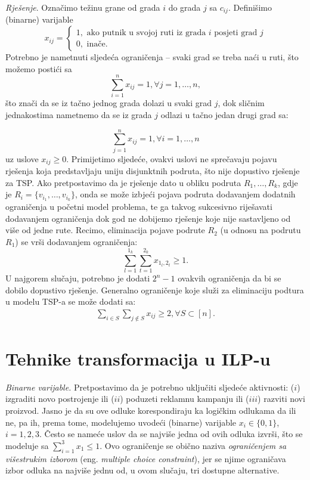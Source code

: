 \documentclass[a4paper, utf8, 11pt, colorlinks]{book}
\begin{document}
\emph{Rješenje}. Označimo težinu grane od grada $i$ do grada $j$ sa $c_{ij}$.  Definišimo (binarne) varijable 
$$x_{ij} = \begin{cases}
                1, \mbox{ ako putnik u svojoj ruti iz grada } i \mbox{ posjeti grad } j \\
                0, \mbox{ inače}. 
          \end{cases}$$ 
Potrebno je nametnuti sljedeća ograničenja -- svaki grad se treba naći u ruti,  što možemo postići sa 
$$  \sum_{i=1}^n x_{ij} = 1, \forall j =1,\ldots, n,$$ 
što znači da se iz tačno jednog grada dolazi u svaki grad $j$, dok sličnim jednakostima nametnemo da se iz grada $j$ odlazi u tačno jedan drugi grad sa:

$$  \sum_{j=1}^n x_{ij} = 1, \forall i =1,\ldots, n$$ 
 uz uslove $x_{ij}\geq 0$. Primijetimo sljedeće, ovakvi uslovi ne sprečavaju pojavu rješenja koja predstavljaju uniju disjunktnih podruta, što nije dopustivo rješenje za TSP. Ako pretpostavimo da je rješenje dato u obliku podruta $R_1, \ldots, R_k$, gdje je $R_i = \{ v_{i_1}, \ldots, v_{i_k} \}$, onda se može izbjeći pojava podruta dodavanjem dodatnih ograničenja u početni model problema, te ga takvog sukcesivno riješavati dodavanjem ograničenja dok god ne dobijemo rješenje koje nije sastavljeno od više od jedne rute. Recimo, eliminacija pojave podrute $R_2$ (u odnosu na podrutu $R_1$) se vrši dodavanjem ograničenja:
 $$ \sum_{l=1}^{1_k}\sum_{t=1}^{2_k} x_{1_l, 2_t} \geq 1.$$
 U najgorem slučaju, potrebno je dodati $2^n-1$ ovakvih ograničenja da bi se dobilo dopustivo rješenje. 
 Generalno ograničenje koje služi za eliminaciju podtura u modelu TSP-a se može dodati sa:
 \begin{align}
 	  \sum_{i \in S} \sum_{j \notin S} x_{ij} \geq 2, \forall S \subset [n].
 \end{align}
 
 \section{Tehnike transformacija u ILP-u}
 
 \emph{Binarne varijable.} Pretpostavimo da je potrebno uključiti sljedeće aktivnosti: ($i$) izgraditi novo postrojenje ili
($ii$) poduzeti reklamnu kampanju ili ($iii$) razviti novi proizvod. Jasno je da su ove odluke korespondiraju ka logičkim odlukama da ili ne, pa ih, prema tome, modelujemo   uvodeći  (binarne) varijable $x_i \in \{0, 1 \}$, $i=1,2,3$. Često se nameće uslov da se najviše jedna od ovih odluka izvrši, što se modeluje sa $\sum_{i=1}^3 x_1 \leq 1$. Ovo ograničenje se obično naziva \emph{ograničenjem sa višestrukim izborom} (eng. \emph{multiple choice constraint}), jer se njime ograničava izbor odluka na najviše jednu od, u ovom slučaju, tri dostupne alternative. 
\end{document}
